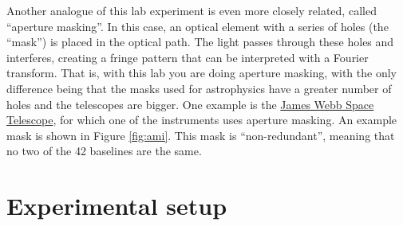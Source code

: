 \documentclass[11pt]{article}
\begin{document}
Another analogue of this lab experiment is even more closely related, called ``aperture masking''. In this case, an optical element with a series of holes (the ``mask'') is placed in the optical path. The light passes through these holes and interferes, creating a fringe pattern that can be interpreted with a Fourier transform. That is, with this lab you are doing aperture masking, with the only difference being that the masks used for astrophysics have a greater number of holes and the telescopes are bigger. One example is the \href{https://jwst-docs.stsci.edu/jwst-near-infrared-imager-and-slitless-spectrograph/niriss-observing-modes/niriss-aperture-masking-interferometry}{James Webb Space Telescope}, for which one of the instruments uses aperture masking. An example mask is shown in Figure \ref{fig:ami}. This mask is ``non-redundant'', meaning that no two of the 42 baselines are the same.

\clearpage
\section{Experimental setup}
\end{document}

